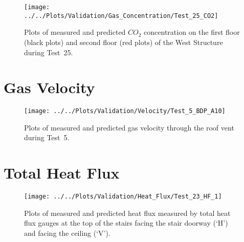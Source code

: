 \begin{figure}[!h]
	\centering
	\texttt{[image: ../../Plots/Validation/Gas\_Concentration/Test\_25\_CO2]}
	\caption[Plots of measured and predicted $CO_2$ concentration during Test~25.]{Plots of measured and predicted $CO_2$ concentration on the first floor (black plots) and second floor (red plots) of the West Structure during Test~25.}
	\label{fig:Test25_CO2}
\end{figure}

\clearpage
\section{Gas Velocity}
\begin{figure}[!h]
	\centering
	\texttt{[image: ../../Plots/Validation/Velocity/Test\_5\_BDP\_A10]}
	\caption[Plots of measured and predicted gas velocity through the roof vent during Test~5.]{Plots of measured and predicted gas velocity through the roof vent during Test~5.}
	\label{fig:Test5_BDPs}
\end{figure}

\clearpage
\section{Total Heat Flux}
\begin{figure}[!h]
	\centering
	\texttt{[image: ../../Plots/Validation/Heat\_Flux/Test\_23\_HF\_1]}
	\caption[Plots of measured and predicted heat flux during Test~23.]{Plots of measured and predicted heat flux measured by total heat flux gauges at the top of the stairs facing the stair doorway (`H') and facing the ceiling (`V').}
	\label{fig:Test5_BDPs}
\end{figure}
